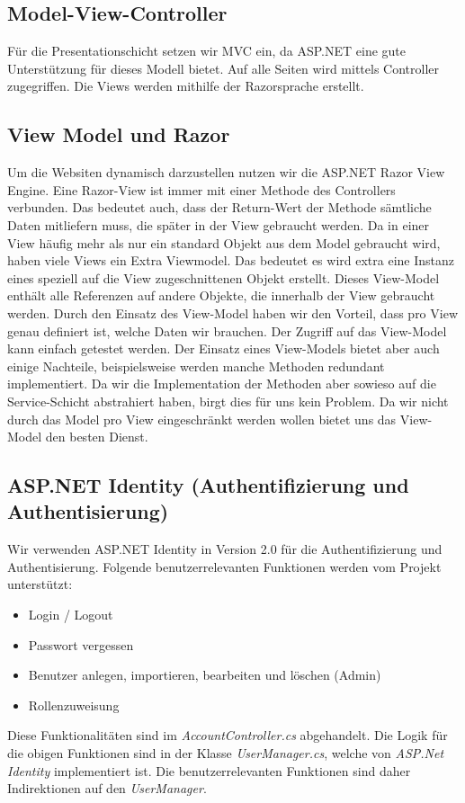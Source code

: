 	\subsection{Model-View-Controller}
		Für die Presentationschicht setzen wir MVC ein, da ASP.NET eine gute Unterstützung für dieses Modell bietet. Auf alle Seiten wird mittels Controller zugegriffen. Die Views werden mithilfe der Razorsprache erstellt.

	\subsection{View Model und Razor}
		Um die Websiten dynamisch darzustellen nutzen wir die ASP.NET Razor View Engine. Eine Razor-View ist immer mit einer Methode des Controllers verbunden. Das bedeutet auch, dass der Return-Wert der Methode sämtliche Daten mitliefern muss, die später in der View gebraucht werden. Da in einer View häufig mehr als nur ein standard Objekt aus dem Model gebraucht wird, haben viele Views ein Extra Viewmodel. Das bedeutet es wird extra eine Instanz eines speziell auf die View zugeschnittenen Objekt erstellt. Dieses View-Model enthält alle Referenzen auf andere Objekte, die innerhalb der View gebraucht werden.
		Durch den Einsatz des View-Model haben wir den Vorteil, dass pro View genau definiert ist, welche Daten wir brauchen. Der Zugriff auf das View-Model kann einfach getestet werden.
		Der Einsatz eines View-Models bietet aber auch einige Nachteile, beispielsweise werden manche Methoden redundant implementiert. Da wir die Implementation der Methoden aber sowieso auf die Service-Schicht abstrahiert haben, birgt dies für uns kein Problem.
		Da wir nicht durch das Model pro View eingeschränkt werden wollen bietet uns das View-Model den besten Dienst.

	\subsection{ASP.NET Identity (Authentifizierung und Authentisierung)}
		Wir verwenden ASP.NET Identity in Version 2.0 für die Authentifizierung und Authentisierung. Folgende benutzerrelevanten Funktionen werden vom Projekt unterstützt:
		\\\begin{itemize}	
			\item Login / Logout
			\item Passwort vergessen
			\item Benutzer anlegen, importieren, bearbeiten und löschen (Admin)
			\item Rollenzuweisung
		\end{itemize}
		Diese Funktionalitäten sind im \textit{AccountController.cs} abgehandelt. Die Logik für die obigen Funktionen sind in der Klasse \textit{UserManager.cs}, welche von \textit{ASP.Net Identity} implementiert ist. Die benutzerrelevanten Funktionen sind daher Indirektionen auf den \textit{UserManager}.

